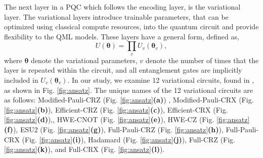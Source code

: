 \documentclass[journal=jacsat,manuscript=article]{achemso}
\begin{document}
The next layer in a PQC which follows the encoding layer, is the variational layer.
The variational layers introduce trainable parameters, that can be optimized using classical compute resources, into the quantum circuit and provide flexibility to the QML models.
These layers have a general form, defined as,
\begin{equation}
	U(\bm{\theta}) = \prod_{v} U_{v}(\bm{\theta}_{v}), %
	\label{eq:general_variational}
\end{equation}
where $\bm{\theta}$ denote the variational parameters, $v$ denote the number of times that the layer is repeated within the circuit, and all entanglement gates are implicitly included in $U_{v}(\bm{\theta}_{v})$.
In our study, we examine 12 variational circuits, found in \cite{sim_expressibility_2019}, as shown in Fig. \ref{fig:ansatz}.
The unique names of the 12 variational circuits are as follows: Modified-Pauli-CRZ (Fig. \ref{fig:ansatz}\textbf{(a)}) , Modified-Pauli-CRX (Fig. \ref{fig:ansatz}\textbf{(b)}), Efficient-CRZ (Fig. \ref{fig:ansatz}\textbf{(c)}), Efficient-CRX (Fig. \ref{fig:ansatz}\textbf{(d)}),, HWE-CNOT (Fig. \ref{fig:ansatz}\textbf{(e)}), HWE-CZ (Fig. \ref{fig:ansatz}\textbf{(f)}), ESU2 (Fig. \ref{fig:ansatz}\textbf{(g)}), Full-Pauli-CRZ (Fig. \ref{fig:ansatz}\textbf{(h)}), Full-Pauli-CRX (Fig. \ref{fig:ansatz}\textbf{(i)}), Hadamard (Fig. \ref{fig:ansatz}\textbf{(j)}), Full-CRZ (Fig. \ref{fig:ansatz}\textbf{(k)}), and Full-CRX (Fig. \ref{fig:ansatz}\textbf{(l)}).
\end{document}
